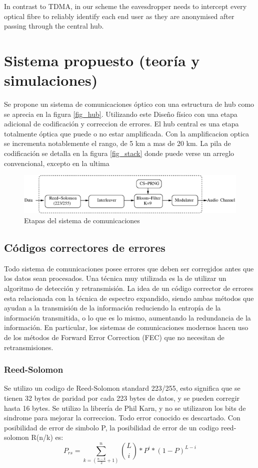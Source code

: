 \documentclass[12pt,twoside,openright]{moddalthesis}
\begin{document}
In contrast to TDMA, in our scheme the eavesdropper needs to intercept every optical fibre to reliably identify each end user as they are anonymised after passing through the central hub.



\section{Sistema propuesto (teoría y simulaciones)}

Se propone un sistema de comunicaciones óptico con una estructura de hub como se aprecia en la figura \ref{fig_hub}. Utilizando este Diseño físico con una etapa adicional de codificación y correccion de errores. El hub central es una etapa totalmente óptica que puede o no estar amplificada. Con la amplificacion optica se incrementa notablemente el rango, de 5 km a mas de 20 km.
La pila de codificación se detalla en la figura \ref{fig_stack} donde puede verse un arreglo convencional, excepto en la ultima 

\begin{figure}[t]
\centering
\includegraphics[width=0.9 \textwidth]{Soft-stack2.eps} 
\caption{Etapas del sistema de comunicaciones}
\label{fig_comstack}
\end{figure}

\subsection{Códigos correctores de errores}

Todo sistema de comunicaciones posee errores que deben ser corregidos antes que los datos sean procesados. Una técnica muy utilizada es la de utilizar un algoritmo de detección y retransmisión.
La idea de un código corrector de errores esta relacionada con la técnica de espectro expandido, siendo ambas métodos que ayudan a la transmisión de la información reduciendo la entropía de la información transmitida, o lo que es lo mismo, aumentando la redundancia de la información. En particular, los sistemas de comunicaciones modernos hacen uso de los métodos de Forward Error Correction (FEC) que no necesitan de retransmisiones.



\subsubsection{Reed-Solomon}
Se utilizo un codigo de Reed-Solomon standard 223/255, esto significa que se tienen 32 bytes de paridad por cada 223 bytes de datos, y se pueden corregir hasta 16 bytes. Se utilizo la librería de Phil Karn, y no se utilizaron los bits de sindrome para mejorar la correccion. Todo error conocido es descartado.
Con posibilidad de error de simbolo P, la posibilidad de error de un codigo reed-solomon R(n/k) es:
$$P_{rs}= \sum_{k=(\frac{n-k}{2}+1)}^{n} \binom{L}{i} * P^{i} * (1-P)^{L-i} $$
\end{document}
